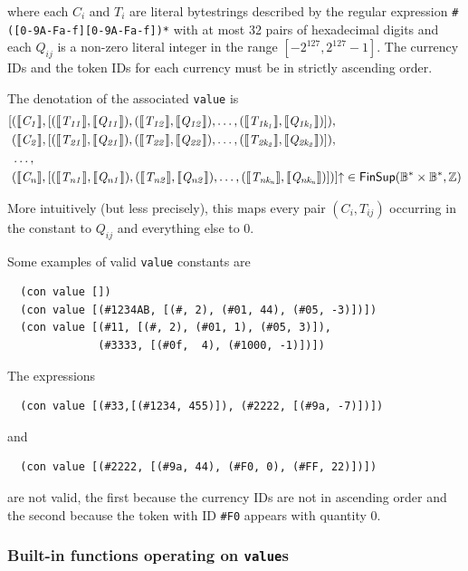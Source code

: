 \noindent where each $C_i$ and $T_i$ are literal bytestrings
described by the regular expression \texttt{\#([0-9A-Fa-f][0-9A-Fa-f])*} with at
most 32 pairs of hexadecimal digits and each $Q_{ij}$ is a non-zero literal integer
in the range $[-2^{127}, 2^{127}-1]$. The currency IDs and the token IDs for
each currency must be in strictly ascending order.

\medskip
\noindent
The denotation of the associated \texttt{value} is
\begin{align*}
 \unflatten{[
  & (\denote{C_1}, [(\denote{T_{11}}, \denote{Q_{11}}), (\denote{T_{12}}, \denote{Q_{12}}),
      \ldots, (\denote{T_{1k_1}}, \denote{Q_{1k_1}})]),\\
  & (\denote{C_2}, [(\denote{T_{21}}, \denote{Q_{21}}), (\denote{T_{22}}, \denote{Q_{22}}),
      \ldots, (\denote{T_{2k_2}}, \denote{Q_{2k_2}})]),\\
  & \ldots, \\
  & (\denote{C_n}, [(\denote{T_{n1}}, \denote{Q_{n1}}), (\denote{T_{n2}}, \denote{Q_{n2}}),
      \ldots, (\denote{T_{nk_n}}, \denote{Q_{nk_n}})])]}
  \in \mathsf{FinSup}(\B^* \times \B^*, \Z)
\end{align*}

\noindent More intuitively (but less precisely), this maps every pair $(C_i, T_{ij})$
occurring in the constant to $Q_{ij}$ and everything else to 0.

\medskip
\noindent
Some examples of valid \texttt{value} constants are
\begin{verbatim}
  (con value [])
  (con value [(#1234AB, [(#, 2), (#01, 44), (#05, -3)])])
  (con value [(#11, [(#, 2), (#01, 1), (#05, 3)]),
              (#3333, [(#0f,  4), (#1000, -1)])])
\end{verbatim}

\noindent
The expressions
\begin{verbatim}
  (con value [(#33,[(#1234, 455)]), (#2222, [(#9a, -7)])])
\end{verbatim}
\noindent and
\begin{verbatim}
  (con value [(#2222, [(#9a, 44), (#F0, 0), (#FF, 22)])])
\end{verbatim}
\noindent are not valid, the first because the currency IDs are not in ascending order
and the second because the token with ID \texttt{\#F0} appears with quantity 0.


\subsubsection{Built-in functions operating on \texttt{value}s}
\label{sec:built-in-value-functions}

